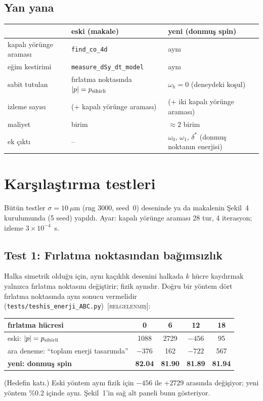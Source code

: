 \documentclass[11pt,a4paper]{article}
\newcommand{\kod}[1]{{\XeTeXinterchartokenstate=0\texttt{#1}}}
\newcommand{\BEL}{\textsc{[belgelenmiş]}}
\begin{document}
\subsection{Yan yana}
\begin{center}\small
\begin{tabularx}{\textwidth}{>{\raggedright\arraybackslash}p{3.6cm}>{\raggedright\arraybackslash}X>{\raggedright\arraybackslash}X}
\toprule
& eski (makale) & yeni (donmuş spin) \\
\midrule
kapalı yörünge araması & \kod{find\_co\_4d} & aynı \\
eğim kestirimi & \kod{measure\_dSy\_dt\_model} & aynı \\
sabit tutulan & fırlatma noktasında $|p|=p_{\rm sihirli}$ & $\omega_h=0$ (deneydeki koşul) \\
izleme sayısı & 1 (+ kapalı yörünge araması) & 2 (+ iki kapalı yörünge araması) \\
maliyet & 1 birim & $\approx2$ birim \\
ek çıktı & -- & $\omega_0$, $\omega_1$, $\delta^*$ (donmuş noktanın enerjisi) \\
\bottomrule
\end{tabularx}
\end{center}

\section{Karşılaştırma testleri}
Bütün testler $\sigma=10~\mu$m (rng 3000, seed~0) deseninde ya da makalenin Şekil~4 kurulumunda (5 seed)
yapıldı. Ayar: kapalı yörünge araması 28 tur, 4 iterasyon; izleme $3\times10^{-4}$~s.

\subsection{Test 1: Fırlatma noktasından bağımsızlık}\label{sec:degismezlik}
Halka simetrik olduğu için, aynı kaçıklık desenini halkada $k$ hücre kaydırmak yalnızca fırlatma
noktasını değiştirir; fizik aynıdır. Doğru bir yöntem dört fırlatma noktasında aynı sonucu vermelidir
(\kod{tests/teshis\_enerji\_ABC.py})~\BEL:
\begin{center}\small
\begin{tabular}{lcccc}
\toprule
fırlatma hücresi & 0 & 6 & 12 & 18 \\
\midrule
eski: $|p|=p_{\rm sihirli}$ & 1088 & 2729 & $-456$ & 95 \\
ara deneme: ``toplam enerji tasarımda'' & $-376$ & 162 & $-722$ & 567 \\
\textbf{yeni: donmuş spin} & \textbf{82.04} & \textbf{81.90} & \textbf{81.89} & \textbf{81.94} \\
\bottomrule
\end{tabular}
\end{center}
(Hedefin katı.) Eski yöntem aynı fizik için $-456$ ile $+2729$ arasında değişiyor; yeni yöntem \%0.2 içinde
aynı. Şekil~1'in sağ alt paneli bunu gösteriyor.
\end{document}
